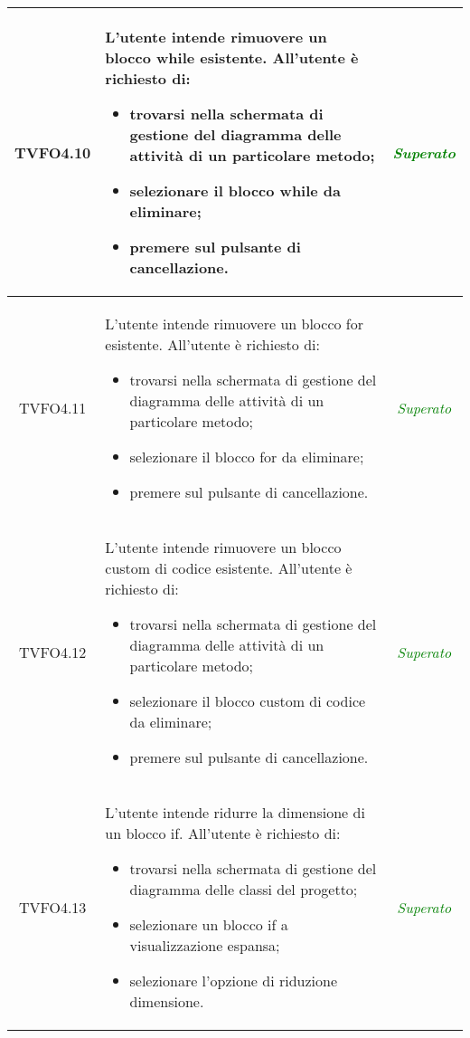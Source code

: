 \begin{longtable}{|c|>{}m{8cm}|c|}
\hypertarget{TVFO4.10}{TVFO4.10} & L'utente intende rimuovere un blocco while esistente.
All'utente è richiesto di:
\begin{itemize}
	\item trovarsi nella schermata di gestione del diagramma delle attività di un particolare metodo;
	\item selezionare il blocco while da eliminare;
	\item premere sul pulsante di cancellazione.
\end{itemize} & \textcolor{Green}{\textit{Superato}}\\ \hline

\hypertarget{TVFO4.11}{TVFO4.11} & L'utente intende rimuovere un blocco for esistente.
All'utente è richiesto di:
\begin{itemize}
	\item trovarsi nella schermata di gestione del diagramma delle attività di un particolare metodo;
	\item selezionare il blocco for da eliminare;
	\item premere sul pulsante di cancellazione.
\end{itemize} & \textcolor{Green}{\textit{Superato}}\\ \hline

\hypertarget{TVFO4.12}{TVFO4.12} & L'utente intende rimuovere un blocco custom di codice esistente.
All'utente è richiesto di:
\begin{itemize}
	\item trovarsi nella schermata di gestione del diagramma delle attività di un particolare metodo;
	\item selezionare il blocco custom di codice da eliminare;
	\item premere sul pulsante di cancellazione.
\end{itemize} & \textcolor{Green}{\textit{Superato}}\\ \hline

\hypertarget{TVFO4.13}{TVFO4.13} & L'utente intende ridurre la dimensione di un blocco if.
All'utente è richiesto di:
\begin{itemize}
	\item trovarsi nella schermata di gestione del diagramma delle classi del progetto;
	\item selezionare un blocco if a visualizzazione espansa;
	\item selezionare l'opzione di riduzione dimensione.
\end{itemize} & \textcolor{Green}{\textit{Superato}}\\ \hline


\end{longtable}
